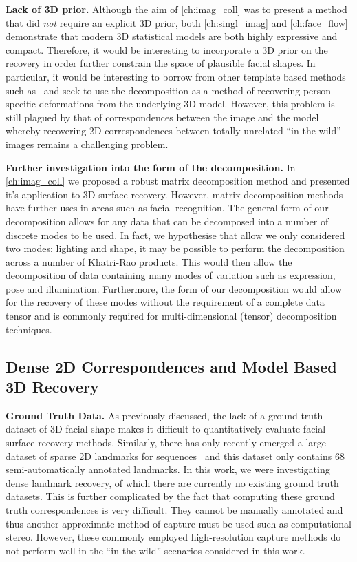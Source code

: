 \textbf{Lack of 3D prior.} Although the aim of \cref{ch:imag_coll} was to
present a method that did \textit{not} require an explicit 3D prior, both
\cref{ch:singl_imag} and \cref{ch:face_flow} demonstrate that modern 3D statistical
models are both highly expressive and compact. Therefore, it would be
interesting to incorporate a 3D prior on the recovery in order further constrain
the space of plausible facial shapes. In particular, it would be interesting
to borrow from other template based methods
such as~\cite{kemelmacher2011facereconstruction} and seek to use the decomposition
as a method of recovering person specific deformations from the underlying
3D model. However, this problem is still plagued by that of correspondences
between the image and the model whereby recovering 2D correspondences between
totally unrelated ``in-the-wild'' images remains a challenging problem.

\textbf{Further investigation into the form of the decomposition.}
In \cref{ch:imag_coll} we proposed a robust matrix decomposition method and
presented it's application to 3D surface recovery. However, matrix decomposition
methods have further uses in areas such as facial recognition. The general
form of our decomposition allows for any data that can be decomposed into a number
of discrete modes to be used. In fact, we hypothesise that allow we only
considered two modes: lighting and shape, it may be possible to perform
the decomposition across a number of Khatri-Rao products. This would then allow
the decomposition of data containing many modes of variation such as expression,
pose and illumination. Furthermore, the form of our decomposition would
allow for the recovery of these modes without the requirement of a complete
data tensor and is commonly required for multi-dimensional (tensor) decomposition
techniques.
\subsection{Dense 2D Correspondences and Model Based 3D Recovery}
\textbf{Ground Truth Data.} As previously discussed, the lack of a ground
truth dataset of 3D facial shape makes it difficult to quantitatively evaluate
facial surface recovery methods. Similarly, there has only recently emerged
a large dataset of sparse 2D landmarks for sequences~\cite{shen2015first} and
this dataset only contains 68 semi-automatically annotated landmarks. In this
work, we were investigating dense landmark recovery, of which there are
currently no existing ground truth datasets. This is further complicated by
the fact that computing these ground truth correspondences is very difficult.
They cannot be manually annotated and thus another approximate method of
capture must be used such as computational stereo. However, these commonly
employed high-resolution capture methods do not perform well in the
``in-the-wild'' scenarios considered in this work.

